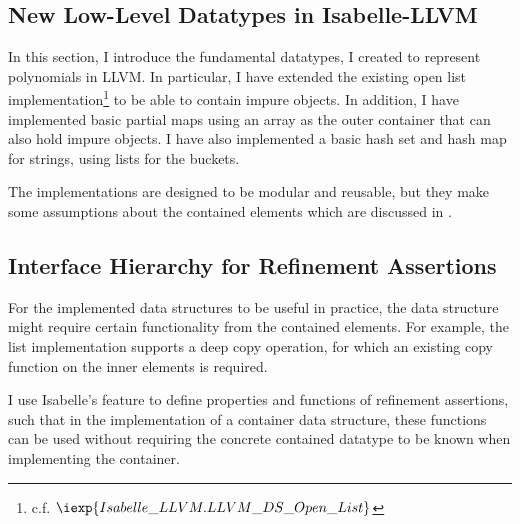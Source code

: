 \subsection{New Low-Level Datatypes in Isabelle-LLVM}\label{sec:low-level-datatypes-in-isabelle-llvm}

In this section, I introduce the fundamental datatypes, I created to represent polynomials in LLVM.
In particular, I have extended the existing open list implementation\footnote{c.f. $\iexp{Isabelle\_LLVM.LLVM\_DS\_Open\_List}$} to be able to contain impure objects.
In addition, I have implemented basic partial maps using an array as the outer container that can also hold impure objects.
I have also implemented a basic hash set and hash map for strings, using lists for the buckets.

The implementations are designed to be modular and reusable, but they make some assumptions about the contained elements which are discussed in .

\subsection{Interface Hierarchy for Refinement Assertions}\label{sec:interface-hierarchy-for-refinement-assertions}

For the implemented data structures to be useful in practice, the data structure might require certain functionality from the contained elements.
For example, the list implementation supports a deep copy operation, for which an existing copy function on the inner elements is required.

I use Isabelle's  feature to define properties and functions of refinement assertions, such that in the implementation of a container data structure, these functions can be used without requiring the concrete contained datatype to be known when implementing the container.

